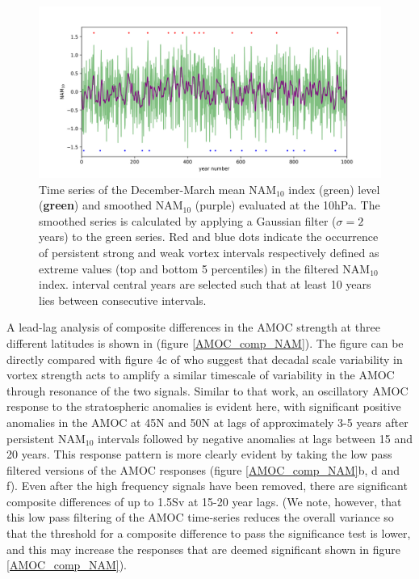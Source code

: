 \begin{figure}[h!]
\begin{center}
\noindent\includegraphics[width = \linewidth]{Figures/Figures-surface/NAM_and_filtered.png} 
\caption[Time series of the December-March mean NAM$_{10}$ index and smoothed NAM$_{10}$]{Time series of the December-March mean NAM$_{10}$ index (green) level (\textbf{green}) and smoothed NAM$_{10}$ (purple) evaluated at the 10hPa. The smoothed series is calculated by applying a Gaussian filter ($\sigma = 2$ years) to the green series. Red and blue dots indicate the occurrence of persistent strong and weak vortex intervals respectively defined as extreme values (top and bottom 5 percentiles) in the filtered NAM$_{10}$ index. interval central years are selected such that at least 10 years lies between consecutive intervals.}
\label{NAM_and_filtered}
\end{center}
\end{figure}

A lead-lag analysis of composite differences in the AMOC strength at three different latitudes is shown in  (figure \ref{AMOC_comp_NAM}). The figure can be directly compared with figure 4c of \cite{reichlerStratospheric2012b} who suggest that decadal scale variability in vortex strength acts to amplify a similar timescale of variability in the AMOC through resonance of the two signals. Similar to that work, an oscillatory AMOC response to the stratospheric anomalies is evident here, with significant positive anomalies in the AMOC at 45N and 50N at lags of approximately 3-5 years after persistent NAM$_{10}$ intervals followed by negative anomalies at lags between 15 and 20 years. This response pattern is more clearly evident by taking the low pass filtered versions of the AMOC responses (figure \ref{AMOC_comp_NAM}b, d and f). Even after the high frequency signals have been removed, there are significant composite differences of up to 1.5Sv at 15-20 year lags. (We note, however, that this low pass filtering of the AMOC time-series reduces the overall variance so that the threshold for a composite difference to pass the significance test is lower, and this may increase the responses that are deemed significant shown in figure \ref{AMOC_comp_NAM}). 

